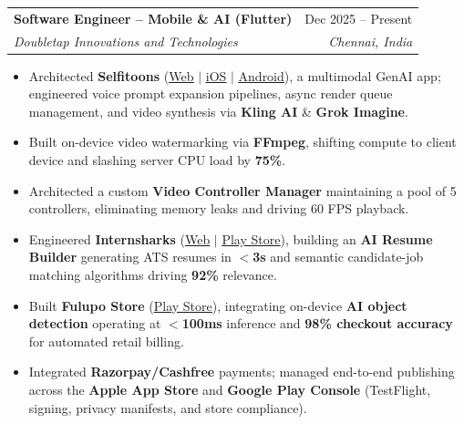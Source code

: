 \documentclass[letterpaper,10pt]{article}
\makeatletter
\newcommand{\resumeItem}[1]{
  \item\small{
    {#1 \vspace{-2pt}}
  }
}
\newcommand{\resumeSubheading}[4]{
  \vspace{-2pt}\item
    \begin{tabular*}{0.97\textwidth}[t]{l@{\extracolsep{\fill}}r}
      \textbf{#1} & #2 \\
      \textit{\small#3} & \textit{\small #4} \\
    \end{tabular*}\vspace{-6pt}
}
\newcommand{\resumeItemListStart}{\begin{itemize}}
\newcommand{\resumeItemListEnd}{\end{itemize}\vspace{-5pt}}
\makeatother
\begin{document}
    \resumeSubheading
      {Software Engineer -- Mobile \& AI (Flutter)}{Dec 2025 -- Present}
      {Doubletap Innovations and Technologies}{Chennai, India}
      \resumeItemListStart
        \resumeItem{Architected \textbf{Selfitoons} (\href{https://selfitoons.ai/}{\underline{Web}} $|$ \href{https://apps.apple.com/in/app/selfitoons/id6758597947}{\underline{iOS}} $|$ \href{https://play.google.com/store/apps/details?id=com.doubletap.ai.selfitoons}{\underline{Android}}), a multimodal GenAI app; engineered voice prompt expansion pipelines, async render queue management, and video synthesis via \textbf{Kling AI} \& \textbf{Grok Imagine}.}
        \resumeItem{Built on-device video watermarking via \textbf{FFmpeg}, shifting compute to client device and slashing server CPU load by \textbf{75\%}.}
        \resumeItem{Architected a custom \textbf{Video Controller Manager} maintaining a pool of 5 controllers, eliminating memory leaks and driving 60 FPS playback.}
        \resumeItem{Engineered \textbf{Internsharks} (\href{https://internsharks.ai/}{\underline{Web}} $|$ \href{https://play.google.com/store/apps/details?id=com.doubletap.internsharks.ai}{\underline{Play Store}}), building an \textbf{AI Resume Builder} generating ATS resumes in \textbf{$<$3s} and semantic candidate-job matching algorithms driving \textbf{92\%} relevance.}
        \resumeItem{Built \textbf{Fulupo Store} (\href{https://play.google.com/store/apps/details?id=com.doubletap.fulupostore}{\underline{Play Store}}), integrating on-device \textbf{AI object detection} operating at \textbf{$<$100ms} inference and \textbf{98\% checkout accuracy} for automated retail billing.}
        \resumeItem{Integrated \textbf{Razorpay/Cashfree} payments; managed end-to-end publishing across the \textbf{Apple App Store} and \textbf{Google Play Console} (TestFlight, signing, privacy manifests, and store compliance).}
      \resumeItemListEnd
\end{document}
